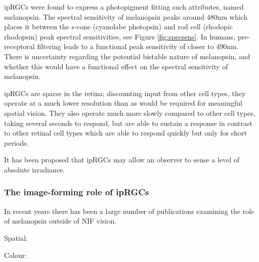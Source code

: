 \Glspl{ipRGC} were found to express a photopigment fitting such attributes, named melanopsin. The spectral sensitivity of melanopsin peaks around 480nm\citep{qiu_induction_2005,hankins_primary_2002,dacey_melanopsin-expressing_2005,peirson_melanopsin_2006,bailes_human_2013} which places it between the s-cone (cyanolabe photopsin) and rod cell (rhodopic rhodopsin) peak spectral sensitivities, see Figure \ref{fig:specsens}. In humans, pre-receptoral filtering leads to a functional peak sensitivity of closer to 490nm\citep{cie_cie_2015-1}. There is uncertainty regarding the potential bistable nature of melanopsin, and whether this would have a functional effect on the spectral sensitivity of melanopsin\citep{cie_cie_2015-1,mure_melanopsin_2009,rollag_does_2008}.

\Glspl{ipRGC} are sparse in the retina; discounting input from other cell types, they operate at a much lower resolution than as would be required for meaningful spatial vision. They also operate much more slowly compared to other cell types, taking several seconds to respond, but are able to sustain a response in contrast to other retinal cell types which are able to respond quickly but only for short periods.

It has been proposed that \glspl{ipRGC} may allow an observer to sense a level of absolute irradiance\citep{brown_melanopsin_2010}. 

\subsubsection{The image-forming role of ipRGCs}

In recent years there has been a large number of publications examining the role of melanopsin outside of \gls{NIF} vision.

Spatial:
\cite{ecker_melanopsin-expressing_2010}
\cite{spitschan_vision_2017}
\cite{mouland_responses_2017}
\cite{allen_melanopsin_2017}
\cite{allen_form_2019}

Colour:
\cite{cao_evidence_2018}
\cite{spitschan_human_2017-1}
\cite{zele_melanopsin_2018}